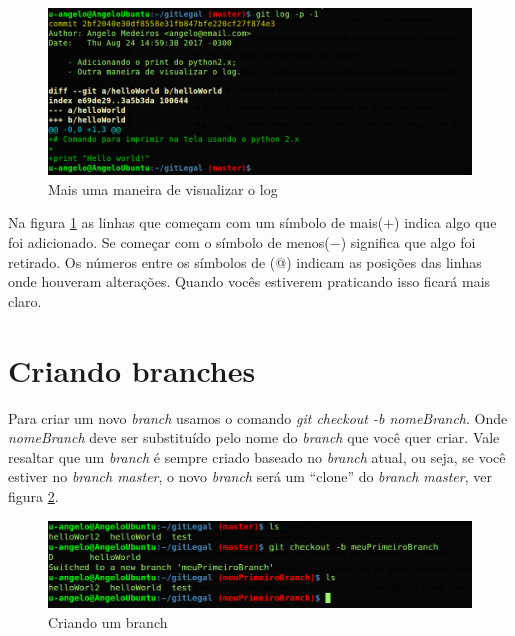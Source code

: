 \documentclass[12pt,openright,oneside,a4paper,english,brazil]{abntex2}
\begin{document}
\begin{figure}[H]
	\caption{\label{logp}Mais uma maneira de visualizar o log}
	\begin{center}
		\includegraphics[width=1\linewidth]{imagens/logp}
	\end{center}
\end{figure}

Na figura \ref{logp} as linhas que começam com um símbolo de mais(+) indica algo que foi adicionado. Se começar com o símbolo de menos($-$) significa que algo foi retirado. Os números entre os símbolos de (@) indicam as posições das linhas onde houveram alterações. Quando vocês estiverem praticando isso ficará mais claro.

\section{Criando branches \label{criandobranch}}

Para criar um novo \textit{branch} usamos o comando \textit{git checkout -b nomeBranch}. Onde \textit{nomeBranch} deve ser substituído pelo nome do \textit{branch} que você quer criar. Vale resaltar que um \textit{branch} é sempre criado baseado no \textit{branch} atual, ou seja, se você estiver no\textit{ branch master}, o novo \textit{branch} será um ``clone'' do \textit{branch master}, ver figura \ref{novobranch}.

\begin{figure}[H]
	\caption{\label{novobranch}Criando um branch}
	\begin{center}
		\includegraphics[width=1\linewidth]{imagens/novobranch}
	\end{center}
\end{figure}
\end{document}
